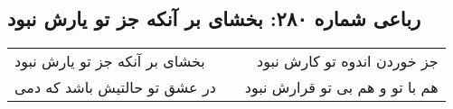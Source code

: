 \begin{center}
\section*{رباعی شماره ۲۸۰: بخشای بر آنکه جز تو یارش نبود}
\label{sec:sh280}
\begin{longtable}{l p{0.5cm} r}
بخشای بر آنکه جز تو یارش نبود
&&
جز خوردن اندوه تو کارش نبود
\\
در عشق تو حالتیش باشد که دمی
&&
هم با تو و هم بی تو قرارش نبود
\\
\end{longtable}
\end{center}

